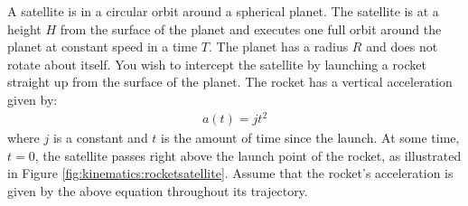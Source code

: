 \question A satellite is in a circular orbit around a spherical planet. The satellite is at a height $H$ from the surface of the planet and executes one full orbit around the planet at constant speed in a time $T$. The planet has a radius $R$ and does not rotate about itself. You wish to intercept the satellite by launching a rocket straight up from the surface of the planet. The rocket has a vertical acceleration given by:
\begin{align*}
a(t) = jt^2
\end{align*}
where $j$ is a constant and $t$ is the amount of time since the launch. At some time, $t=0$, the satellite passes right above the launch point of the rocket, as illustrated in Figure \ref{fig:kinematics:rocketsatellite}. Assume that the rocket's acceleration is given by the above equation throughout its trajectory.
